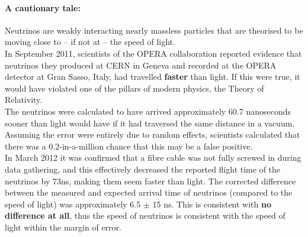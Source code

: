 

\begin{tip}
\paragraph{A cautionary tale:} Neutrinos are weakly interacting nearly massless particles that are theorised to be moving close to -- if not at -- the speed of light.\\

In September 2011, scientists of the OPERA collaboration reported evidence that neutrinos they produced at CERN in Geneva and recorded at the OPERA detector at Gran Sasso, Italy, had travelled \textbf{faster} than light. If this were true, it would have violated one of the pillars of modern physics, the Theory of Relativity.\\

The neutrinos were calculated to have arrived approximately 60.7 nanoseconds sooner than light would have if it had traversed the same distance in a vacuum. Assuming the error were entirely due to random effects, scientists calculated that there was a 0.2-in-a-million chance that this may be a false positive.\\

In March 2012 it was confirmed that a fibre cable was not fully screwed in during data gathering, and this effectively decreased the reported flight time of the neutrinos by 73ns, making them seem faster than light. The corrected difference between the measured and expected arrival time of neutrinos (compared to the speed of light) was approximately 6.5 $\pm$ 15 ns. This is consistent with \textbf{no difference at all}, thus the speed of neutrinos is consistent with the speed of light within the margin of error.
\end{tip}


